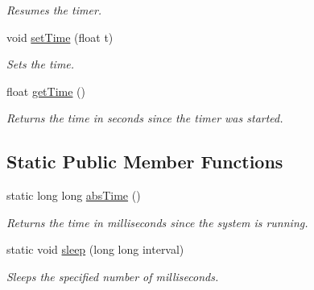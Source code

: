 \begin{DoxyCompactItemize}
\begin{DoxyCompactList}\small\item\em \-Resumes the timer. \end{DoxyCompactList}\item 
\hypertarget{classMyTimer_a25463345b8562ab2baba586e60c11e71}{
void \hyperlink{classMyTimer_a25463345b8562ab2baba586e60c11e71}{set\-Time} (float t)}
\label{d0/df5/classMyTimer_a25463345b8562ab2baba586e60c11e71}

\begin{DoxyCompactList}\small\item\em \-Sets the time. \end{DoxyCompactList}\item 
\hypertarget{classMyTimer_ad9c510838c0e2dc67069aceeefdb7e61}{
float \hyperlink{classMyTimer_ad9c510838c0e2dc67069aceeefdb7e61}{get\-Time} ()}
\label{d0/df5/classMyTimer_ad9c510838c0e2dc67069aceeefdb7e61}

\begin{DoxyCompactList}\small\item\em \-Returns the time in seconds since the timer was started. \end{DoxyCompactList}\end{DoxyCompactItemize}
\subsection*{\-Static \-Public \-Member \-Functions}
\begin{DoxyCompactItemize}
\item 
\hypertarget{classMyTimer_a97961060bd3fd25ee701e2430c53d217}{
static long long \hyperlink{classMyTimer_a97961060bd3fd25ee701e2430c53d217}{abs\-Time} ()}
\label{d0/df5/classMyTimer_a97961060bd3fd25ee701e2430c53d217}

\begin{DoxyCompactList}\small\item\em \-Returns the time in milliseconds since the system is running. \end{DoxyCompactList}\item 
\hypertarget{classMyTimer_ab91eb329e15b5ff9ffa0de9e6286aa5b}{
static void \hyperlink{classMyTimer_ab91eb329e15b5ff9ffa0de9e6286aa5b}{sleep} (long long interval)}
\label{d0/df5/classMyTimer_ab91eb329e15b5ff9ffa0de9e6286aa5b}

\begin{DoxyCompactList}\small\item\em \-Sleeps the specified number of milliseconds. \end{DoxyCompactList}\end{DoxyCompactItemize}
